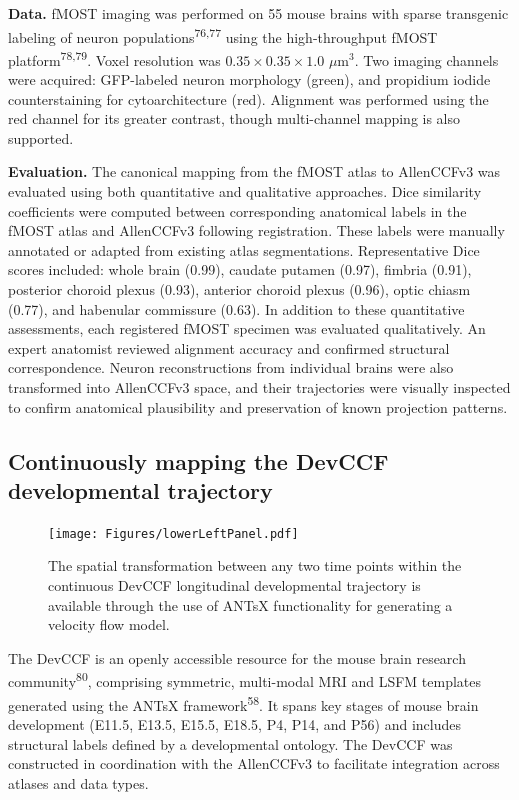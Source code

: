 \documentclass[
  12pt,
]{article}
\begin{document}
\textbf{Data.} fMOST imaging was performed on 55 mouse brains with
sparse transgenic labeling of neuron populations\textsuperscript{76,77}
using the high-throughput fMOST platform\textsuperscript{78,79}. Voxel
resolution was \(0.35\times 0.35\times 1.0\) \(\mu\)m\(^3\). Two imaging
channels were acquired: GFP-labeled neuron morphology (green), and
propidium iodide counterstaining for cytoarchitecture (red). Alignment
was performed using the red channel for its greater contrast, though
multi-channel mapping is also supported.

\textbf{Evaluation.} The canonical mapping from the fMOST atlas to
AllenCCFv3 was evaluated using both quantitative and qualitative
approaches. Dice similarity coefficients were computed between
corresponding anatomical labels in the fMOST atlas and AllenCCFv3
following registration. These labels were manually annotated or adapted
from existing atlas segmentations. Representative Dice scores included:
whole brain (0.99), caudate putamen (0.97), fimbria (0.91), posterior
choroid plexus (0.93), anterior choroid plexus (0.96), optic chiasm
(0.77), and habenular commissure (0.63). In addition to these
quantitative assessments, each registered fMOST specimen was evaluated
qualitatively. An expert anatomist reviewed alignment accuracy and
confirmed structural correspondence. Neuron reconstructions from
individual brains were also transformed into AllenCCFv3 space, and their
trajectories were visually inspected to confirm anatomical plausibility
and preservation of known projection patterns.

\subsection{Continuously mapping the DevCCF developmental
trajectory}\label{continuously-mapping-the-devccf-developmental-trajectory}

\begin{figure}
\centering
\texttt{[image: Figures/lowerLeftPanel.pdf]} \caption{The
spatial transformation between any two time points within the continuous DevCCF
longitudinal developmental trajectory is available through the use of ANTsX
functionality for generating a velocity flow model.}
\label{fig:devccfvelocity}
\end{figure}

The DevCCF is an openly accessible resource for the mouse brain research
community\textsuperscript{80}, comprising symmetric, multi-modal MRI and
LSFM templates generated using the ANTsX framework\textsuperscript{58}.
It spans key stages of mouse brain development (E11.5, E13.5, E15.5,
E18.5, P4, P14, and P56) and includes structural labels defined by a
developmental ontology. The DevCCF was constructed in coordination with
the AllenCCFv3 to facilitate integration across atlases and data types.
\end{document}
